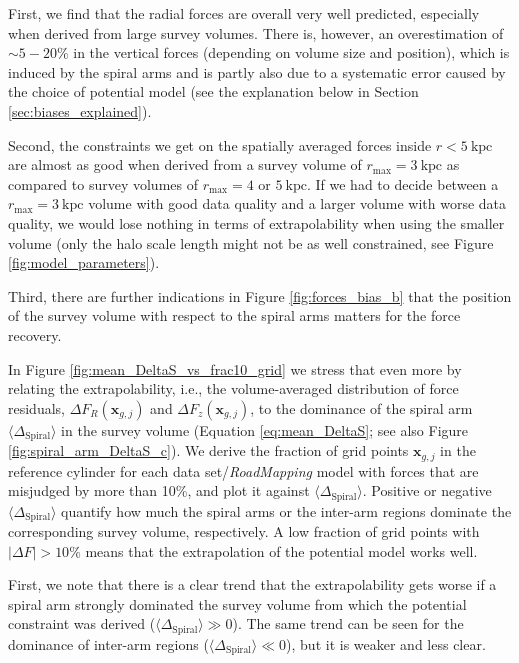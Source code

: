 \documentclass[iop,revtex4,numberedappendix,appendixfloats]{emulateapj}
\newcommand{\vect}[1]{\boldsymbol{#1}}
\newcommand{\RM}{{\sl RoadMapping}}
\begin{document}
First, we find that the radial forces are overall very well predicted, especially when derived from large survey volumes. There is, however, an overestimation of $\sim5-20\%$ in the vertical forces (depending on volume size and position), which is induced by the spiral arms and is partly also due to a systematic error caused by the choice of potential model (see the explanation below in Section \ref{sec:biases_explained}).

Second, the constraints we get on the spatially averaged forces inside $r<5~\text{kpc}$ are almost as good when derived from a survey volume of $r_\text{max}=3~\text{kpc}$ as compared to survey volumes of $r_\text{max}=4$ or $5~\text{kpc}$. If we had to decide between a $r_\text{max}=3~\text{kpc}$ volume with good data quality and a larger volume with worse data quality, we would lose nothing in terms of extrapolability when using the smaller volume (only the halo scale length might not be as well constrained, see Figure \ref{fig:model_parameters}).
 
Third, there are further indications in Figure \ref{fig:forces_bias_b} that the position of the survey volume with respect to the spiral arms matters for the force recovery. 

In Figure \ref{fig:mean_DeltaS_vs_frac10_grid} we stress that even more by relating the extrapolability, i.e., the volume-averaged distribution of force residuals, $\Delta F_R(\vect{x}_{g,j})$ and $\Delta F_z(\vect{x}_{g,j})$, to the dominance of the spiral arm $\langle \Delta_\text{Spiral} \rangle$ in the survey volume (Equation \eqref{eq:mean_DeltaS}; see also Figure \ref{fig:spiral_arm_DeltaS_c}). We derive the fraction of grid points $\vect{x}_{g,j}$ in the reference cylinder for each data set/\RM{} model with forces that are misjudged by more than 10\%, and plot it against $\langle \Delta_\text{Spiral} \rangle$. Positive or negative $\langle \Delta_\text{Spiral}\rangle$ quantify how much the spiral arms or the inter-arm regions dominate the corresponding survey volume, respectively. A low fraction of grid points with $|\Delta F| > 10\%$ means that the extrapolation of the potential model works well.


First, we note that there is a clear trend that the extrapolability gets worse if a spiral arm strongly dominated the survey volume from which the potential constraint was derived ($\langle \Delta_\text{Spiral} \rangle \gg 0$). The same trend can be seen for the dominance of inter-arm regions ($\langle \Delta_\text{Spiral} \rangle \ll 0$), but it is weaker and less clear.
\end{document}
